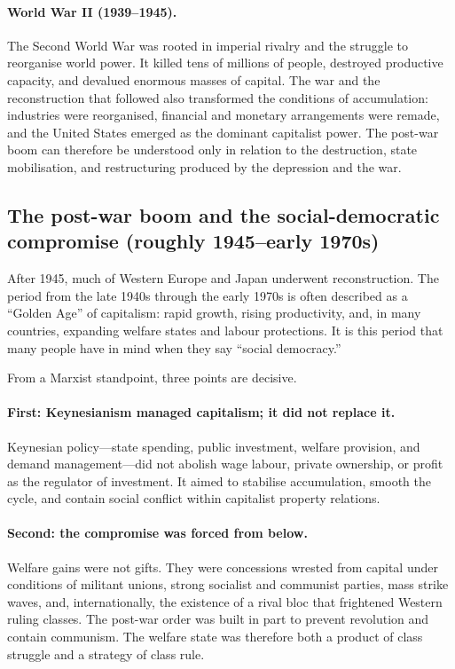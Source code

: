 \paragraph{World War II (1939--1945).}
The Second World War was rooted in imperial rivalry and the struggle to reorganise world power. It killed tens of millions of people, destroyed productive capacity, and devalued enormous masses of capital. The war and the reconstruction that followed also transformed the conditions of accumulation: industries were reorganised, financial and monetary arrangements were remade, and the United States emerged as the dominant capitalist power. The post-war boom can therefore be understood only in relation to the destruction, state mobilisation, and restructuring produced by the depression and the war.

\subsection{The post-war boom and the social-democratic compromise (roughly 1945--early 1970s)}
\label{subsec:postwar-boom}

After 1945, much of Western Europe and Japan underwent reconstruction. The period from the late 1940s through
the early 1970s is often described as a ``Golden Age'' of capitalism: rapid growth, rising productivity, and,
in many countries, expanding welfare states and labour protections. It is this period that many people have in
mind when they say ``social democracy.''

From a Marxist standpoint, three points are decisive.

\paragraph{First: Keynesianism managed capitalism; it did not replace it.}
Keynesian policy—state spending, public investment, welfare provision, and demand management—did not abolish
wage labour, private ownership, or profit as the regulator of investment. It aimed to stabilise accumulation, smooth the cycle, and contain social conflict within
capitalist property relations.

\paragraph{Second: the compromise was forced from below.}
Welfare gains were not gifts. They were concessions wrested from capital under conditions of militant unions,
strong socialist and communist parties, mass strike waves, and, internationally, the existence of a rival bloc
that frightened Western ruling classes. The post-war order was built in part to prevent revolution and contain
communism. The welfare state was therefore both a product of class struggle and a strategy of class rule.


